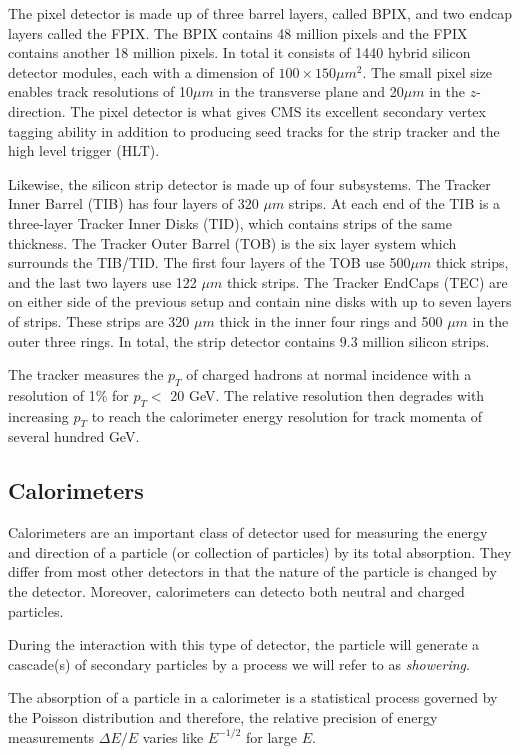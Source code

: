 The pixel detector is made up of three barrel layers, called BPIX, and two endcap layers called the FPIX. The BPIX contains 48 million pixels and the FPIX contains another 18 million pixels. In total it consists of 1440 hybrid silicon detector modules, each with a dimension of $100 \times 150 \mu m^{2}$. The small pixel size enables track resolutions of 10$\mu m$ in the transverse plane and 20$\mu m$ in the $z$-direction. The pixel detector is what gives CMS its excellent secondary vertex tagging ability in addition to producing seed tracks for the strip tracker and the high level trigger (HLT).

Likewise, the silicon strip detector is made up of four subsystems. The Tracker Inner Barrel (TIB) has four layers of 320 $\mu m$ strips. At each end of the TIB is a three-layer Tracker Inner Disks (TID), which contains strips of the same thickness. The Tracker Outer Barrel (TOB) is the six layer system which surrounds the TIB/TID. The first four layers of the TOB use 500$\mu m$ thick strips, and the last two layers use 122 $\mu m$ thick strips. The Tracker EndCaps (TEC) are on either side of the previous setup and contain nine disks with up to seven layers of strips. These strips are 320 $\mu m$ thick in the inner four rings and 500 $\mu m$ in the outer three rings. In total, the strip detector contains 9.3 million silicon strips.

The tracker measures the $p_{T}$ of charged hadrons at normal incidence with a resolution of 1$\%$ for $p_{T}<$ 20 GeV\cite{Sirunyan_2017}. The relative resolution then degrades with increasing $p_{T}$ to reach the calorimeter energy resolution for track momenta of several hundred GeV.

\subsection{Calorimeters}
Calorimeters are an important class of detector used for measuring the energy and direction of a particle (or collection of particles) by its total absorption. They differ from most other detectors in that the nature of the particle is changed by the detector. Moreover, calorimeters can detecto both neutral and charged particles.

During the interaction with this type of detector, the particle will generate a cascade(s) of secondary particles by a  process we will refer to as \textit{showering}.

The absorption of a particle in a calorimeter is a statistical process governed by the Poisson distribution and therefore, the relative precision of energy measurements $\Delta E / E$ varies like $E^{-1/2}$ for large $E$.

